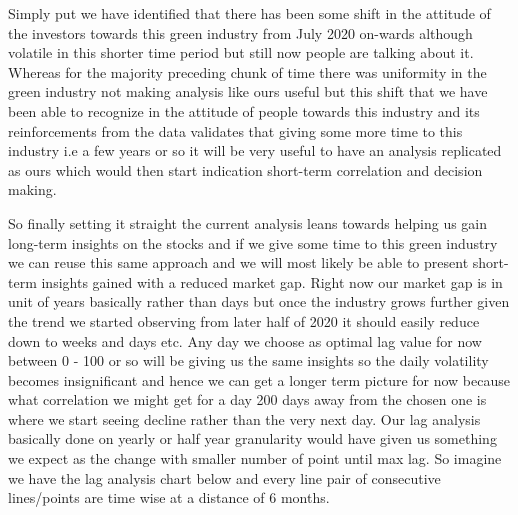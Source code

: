 \documentclass[sigconf, nonacm]{acmart}
\begin{document}
Simply put we have identified that there has been some shift in the attitude of the investors towards this green industry from July 2020 on-wards although volatile in this shorter time period but still now people are talking about it. Whereas for the majority preceding chunk of time there was uniformity in the green industry not making analysis like ours useful but this shift that we have been able to recognize in the attitude of people towards this industry and its reinforcements from the data validates that giving some more time to this industry i.e a few years or so it will be very useful to have an analysis replicated as ours which would then start indication short-term correlation and decision making. \newline

So finally setting it straight the current analysis leans towards helping us gain long-term insights on the stocks and if we give some time to this green industry we can reuse this same approach and we will most likely be able to present short-term insights gained with a reduced market gap. Right now our market gap is in unit of years basically rather than days but once the industry grows further given the trend we started observing from later half of 2020 it should easily reduce down to weeks and days etc. Any day we choose as optimal lag value for now between 0 - 100 or so will be giving us the same insights so the daily volatility becomes insignificant and hence we can get a longer term picture for now because what correlation we might get for a day 200 days away from the chosen one is where we start seeing decline rather than the very next day. Our lag analysis basically done on yearly or half year granularity would have given us something we expect as the change with smaller number of point until max lag. So imagine we have the lag analysis chart below and every line pair of consecutive lines/points are time wise at a distance of 6 months.
\newline
\end{document}
